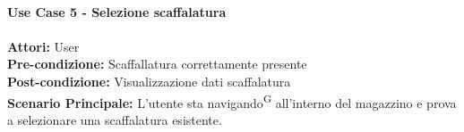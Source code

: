 \Large\textbf{}\\
\Large\textbf{Use Case 5 - Selezione scaffalatura} \\
\vspace{0.5cm}
\large\textbf{} \\
\textbf{Attori:} User\\
\textbf{Pre-condizione:} Scaffallatura correttamente presente \\
\textbf{Post-condizione: } Visualizzazione dati scaffalatura\\
\textbf{Scenario Principale:}  L'utente sta navigando\textsuperscript{G} all'interno del magazzino e prova a selezionare una scaffalatura esistente. \\
\vspace{0.5cm}
